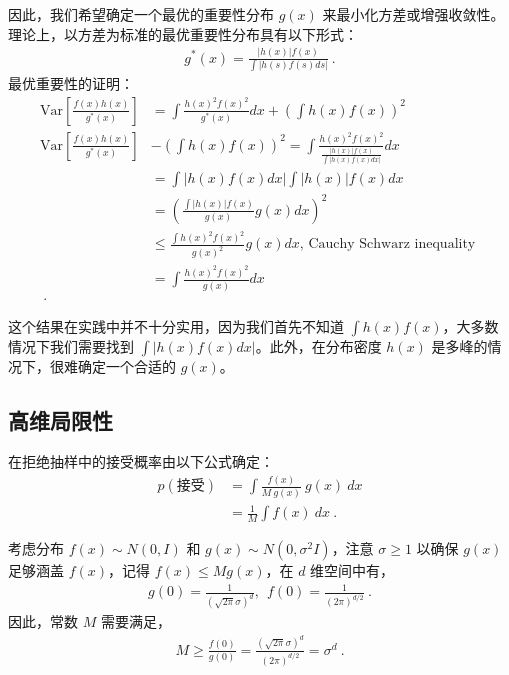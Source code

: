 因此，我们希望确定一个最优的重要性分布 \(g(x)\) 来最小化方差或增强收敛性。理论上，以方差为标准的最优重要性分布具有以下形式：
\begin{align}
    g^{*}(x)=\frac{|h(x)|f(x)}{\int|h(s)f(s)d s|}~.
\end{align}
最优重要性的证明：
\begin{align}
\text{Var}\left[\frac{f(x)h(x)}{g^{*}(x)}\right]&=\int\frac{h(x)^{2}f(x)^{2}}{g^{*}(x)}d x+\left(\int h(x) f(x)\right)^{2} \\ 
\text{Var}\left[\frac{f(x)h(x)}{g^{*}(x)}\right]&-\left(\int h(x) f(x)\right)^{2}=\int\frac{h(x)^{2}f(x)^{2}}{\frac{|h(x)|f(x)}{\int|h(x)f(x)dx|}}d x \\
    &=\int|h(x)f(x)d x|\int|h(x)|f(x)d x\\
    &=\left(\frac{\int|h(x)|f(x)}{g(x)}  g(x) d x\right)^2\\
    &\leq \frac{\int h(x)^2f(x)^2}{g(x)^2}  g(x) d x \text{, Cauchy Schwarz inequality }\\
    &=\int\frac{h(x)^{2}f(x)^{2}}{g(x)}d x\\~.
\end{align}

这个结果在实践中并不十分实用，因为我们首先不知道 $\int h(x) f(x)$，大多数情况下我们需要找到 $\int|h(x)f(x)dx|$。此外，在分布密度 $h(x)$ 是多峰的情况下，很难确定一个合适的 $g(x)$。

\subsection{高维局限性}
在拒绝抽样中的接受概率由以下公式确定：
\begin{align}   
    p(\text{接受}) &=  \int\frac{f(x)}{M \ g(x)} \ g(x) \ d x \\
    &=\frac{1}{M}\int f(x) \ d x~.
\end{align}

考虑分布 $f(x) \sim N(0, I)$ 和 $g(x)\sim N(0, \sigma^2 I)$，注意 $\sigma \geq 1$ 以确保 $g(x)$ 足够涵盖 $f(x)$，记得 $f(x) \leq Mg(x)$，在 $d$ 维空间中有，
\begin{align}
    g(0) = \frac{1}{(\sqrt{2\pi}\sigma)^d}, \ \ f(0) = \frac{1}{(2\pi)^{d/2}}~.
\end{align}
因此，常数 $M$ 需要满足，
\begin{align}
   M \geq \frac{f(0)}{g(0)} = \frac{(\sqrt{2\pi}\sigma)^d}{(2\pi)^{d/2}} = \sigma^d~.
\end{align}